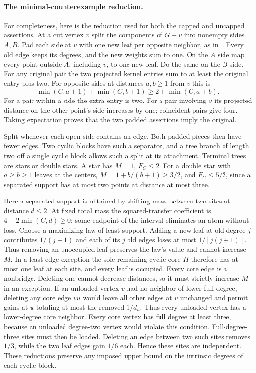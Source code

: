 \documentclass[11pt,a4paper]{article}
\begin{document}
\paragraph{The minimal-counterexample reduction.}
For completeness, here is the reduction used for both the capped and uncapped assertions. At a cut vertex $v$ split the components of $G-v$ into nonempty sides $A,B$. Pad each side at $v$ with one new leaf per opposite neighbor, as in~\cite[Lemma~4]{p13-DLS}. Every old edge keeps its degrees, and the new weights sum to one. On the $A$ side map every point outside $A$, including $v$, to one new leaf. Do the same on the $B$ side. For any original pair the two projected kernel entries sum to at least the original entry plus two. For opposite sides at distances $a,b\ge1$ from $v$ this is
\[
 \min(C,a+1)+\min(C,b+1)\ge 2+\min(C,a+b).
\]
For a pair within a side the extra entry is two. For a pair involving $v$ its projected distance on the other point's side increases by one; coincident pairs give four. Taking expectation proves that the two padded assertions imply the original.

Split whenever each open side contains an edge. Both padded pieces then have fewer edges. Two cyclic blocks have such a separator, and a tree branch of length two off a single cyclic block allows such a split at its attachment. Terminal trees are stars or double stars. A star has $M=1$, $F_C\le2$. For a double star with $a\ge b\ge1$ leaves at the centers, $M=1+b/(b+1)\ge3/2$, and $F_C\le5/2$, since a separated support has at most two points at distance at most three.

Here a separated support is obtained by shifting mass between two sites at distance $d\le2$. At fixed total mass the squared-transfer coefficient is $4-2\min(C,d)\ge0$; some endpoint of the interval eliminates an atom without loss. Choose a maximizing law of least support. Adding a new leaf at old degree $j$ contributes $1/(j+1)$ and each of its $j$ old edges loses at most $1/[j(j+1)]$. Thus removing an unoccupied leaf preserves the law's value and cannot increase $M$. In a least-edge exception the sole remaining cyclic core $H$ therefore has at most one leaf at each site, and every leaf is occupied. Every core edge is a nonbridge. Deleting one cannot decrease distances, so it must strictly increase $M$ in an exception. If an unloaded vertex $v$ had no neighbor of lower full degree, deleting any core edge $vu$ would leave all other edges at $v$ unchanged and permit gains at $u$ totaling at most the removed $1/d_u$. Thus every unloaded vertex has a lower-degree core neighbor. Every core vertex has full degree at least three, because an unloaded degree-two vertex would violate this condition. Full-degree-three sites must then be loaded. Deleting an edge between two such sites removes $1/3$, while the two leaf edges gain $1/6$ each. Hence these sites are independent. These reductions preserve any imposed upper bound on the intrinsic degrees of each cyclic block.
\end{document}
